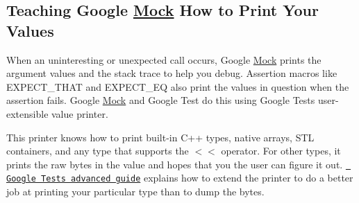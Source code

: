 \subsection*{Teaching Google \mbox{\hyperlink{class_mock}{Mock}} How to Print Your Values}

When an uninteresting or unexpected call occurs, Google \mbox{\hyperlink{class_mock}{Mock}} prints the argument values and the stack trace to help you debug. Assertion macros like {\ttfamily E\+X\+P\+E\+C\+T\+\_\+\+T\+H\+AT} and {\ttfamily E\+X\+P\+E\+C\+T\+\_\+\+EQ} also print the values in question when the assertion fails. Google \mbox{\hyperlink{class_mock}{Mock}} and Google Test do this using Google Test\textquotesingle{}s user-\/extensible value printer.

This printer knows how to print built-\/in C++ types, native arrays, S\+TL containers, and any type that supports the {\ttfamily $<$$<$} operator. For other types, it prints the raw bytes in the value and hopes that you the user can figure it out. \href{../../googletest/docs/advanced.md\#teaching-googletest-how-to-print-your-values}{\texttt{ Google Test\textquotesingle{}s advanced guide}} explains how to extend the printer to do a better job at printing your particular type than to dump the bytes. 